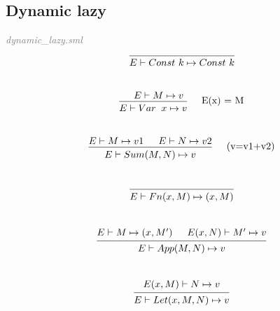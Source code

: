 \documentclass[a4paper]{article}
\begin{document}
	\subsection{Dynamic lazy}
	\textit{\textcolor{gray}{dynamic\_lazy.sml}} \\
	\[
		\begin{prooftree}
			\hypo{}
			\infer1[]{E \vdash Const \ k\mapsto Const \ k}
		\end{prooftree}
	\]
	\\
	\[
		\begin{prooftree}
			\hypo{E \vdash M \mapsto v }
			\infer1[\quad E(x) = M]{E \vdash Var &x \mapsto v}
		\end{prooftree}
	\]
	\\
	\[
		\begin{prooftree}
			\hypo{E \vdash M \mapsto v1}
			\hypo{E \vdash N \mapsto v2 }
			\infer2[\quad (v=v1+v2)]{E \vdash Sum(M, N) \mapsto v}
		\end{prooftree}
	\]
	\\
	\[
		\begin{prooftree}
			\hypo{}
			\infer1[]{E \vdash Fn(x, M) \mapsto (x, M)}
		\end{prooftree}
	\]
	\\
	\[
		\begin{prooftree}
			\hypo{E \vdash M \mapsto (x, M')}
			\hypo{E(x, N) \vdash M' \mapsto v}
			\infer2[]{E \vdash App(M, N) \mapsto v}
		\end{prooftree}
	\]
	\\
	\[
		\begin{prooftree}
			\hypo{E(x,M) \vdash N \mapsto v}
			\infer1[]{E \vdash Let(x, M, N) \mapsto v }
		\end{prooftree}
	\]
	
\end{document}
